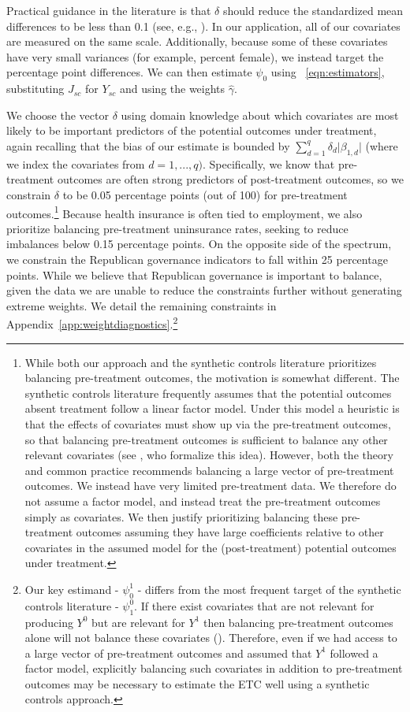 \documentclass[aoas]{imsart}
\theoremstyle{plain}
\theoremstyle{remark}
\begin{document}
Practical guidance in the literature is that $\delta$ should reduce the standardized mean differences to be less than 0.1 (see, e.g., \cite{zhang2019balance}). In our application, all of our covariates are measured on the same scale. Additionally, because some of these covariates have very small variances (for example, percent female), we instead target the percentage point differences. We can then estimate $\psi_0$ using ~\eqref{eqn:estimators}, substituting $J_{sc}$ for $Y_{sc}$ and using the weights $\hat{\gamma}$.

We choose the vector $\delta$ using domain knowledge about which covariates are most likely to be important predictors of the potential outcomes under treatment, again recalling that the bias of our estimate is bounded by $\sum_{d=1}^q \delta_d \lvert \beta_{1,d} \rvert$ (where we index the covariates from $d = 1, ..., q)$. Specifically, we know that pre-treatment outcomes are often strong predictors of post-treatment outcomes, so we constrain $\delta$ to be 0.05 percentage points (out of 100) for pre-treatment outcomes.\footnote{While both our approach and the synthetic controls literature prioritizes balancing pre-treatment outcomes, the motivation is somewhat different. The synthetic controls literature frequently assumes that the potential outcomes absent treatment follow a linear factor model. Under this model a heuristic is that the effects of covariates must show up via the pre-treatment outcomes, so that balancing pre-treatment outcomes is sufficient to balance any other relevant covariates (see \cite{botosaru2019role}, who formalize this idea). However, both the theory and common practice recommends balancing a large vector of pre-treatment outcomes. We instead have very limited pre-treatment data. We therefore do not assume a factor model, and instead treat the pre-treatment outcomes simply as covariates. We then justify prioritizing balancing these pre-treatment outcomes assuming they have large coefficients relative to other covariates in the assumed model for the (post-treatment) potential outcomes under treatment.} Because health insurance is often tied to employment, we also prioritize balancing pre-treatment uninsurance rates, seeking to reduce imbalances below 0.15 percentage points. On the opposite side of the spectrum, we constrain the Republican governance indicators to fall within 25 percentage points. While we believe that Republican governance is important to balance, given the data we are unable to reduce the constraints further without generating extreme weights. We detail the remaining constraints in Appendix~\ref{app:weightdiagnostics}.\footnote{Our key estimand - $\psi_0^1$ - differs from the most frequent target of the synthetic controls literature - $\psi^0_1$. If there exist covariates that are not relevant for producing $Y^0$ but are relevant for $Y^1$ then balancing pre-treatment outcomes alone will not balance these covariates (\cite{botosaru2019role}). Therefore, even if we had access to a large vector of pre-treatment outcomes and assumed that $Y^1$ followed a factor model, explicitly balancing such covariates in addition to pre-treatment outcomes may be necessary to estimate the ETC well using a synthetic controls approach.}
\end{document}
